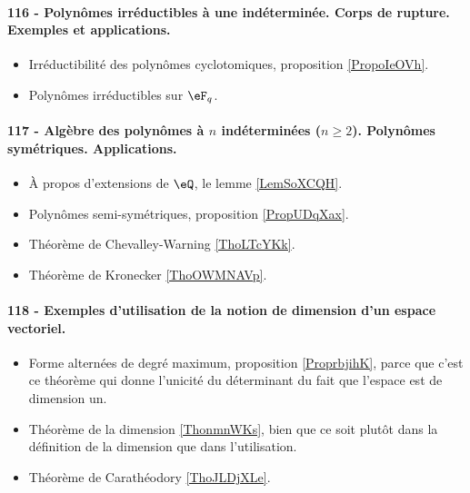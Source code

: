 \paragraph{116 - Polynômes irréductibles à une indéterminée. Corps de rupture. Exemples et applications.}
\begin{itemize}
    \item Irréductibilité des polynômes cyclotomiques, proposition \ref{PropoIeOVh}.
    \item Polynômes irréductibles sur \( \eF_q\).
\end{itemize}

\paragraph{117 - Algèbre des polynômes à \( n\) indéterminées (\( n\geq 2\)). Polynômes symétriques. Applications.}
\begin{itemize}
    \item À propos d'extensions de \( \eQ\), le lemme \ref{LemSoXCQH}.
    \item Polynômes semi-symétriques, proposition \ref{PropUDqXax}.
    \item Théorème de Chevalley-Warning \ref{ThoLTcYKk}.
    \item Théorème de Kronecker \ref{ThoOWMNAVp}.
\end{itemize}

\paragraph{118 - Exemples d’utilisation de la notion de dimension d’un espace vectoriel.}
\begin{itemize}
    \item Forme alternées de degré maximum, proposition \ref{ProprbjihK}, parce que c'est ce théorème qui donne l'unicité du déterminant du fait que l'espace est de dimension un.
    \item Théorème de la dimension \ref{ThonmnWKs}, bien que ce soit plutôt dans la définition de la dimension que dans l'utilisation.
    \item Théorème de Carathéodory \ref{ThoJLDjXLe}.
\end{itemize}

